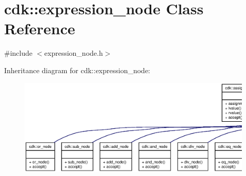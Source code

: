 \section{cdk\+:\+:expression\+\_\+node Class Reference}
\label{classcdk_1_1expression__node}


{\ttfamily \#include $<$expression\+\_\+node.\+h$>$}



Inheritance diagram for cdk\+:\+:expression\+\_\+node\+:
\nopagebreak
\begin{figure}[H]
\begin{center}
\leavevmode
\includegraphics[width=350pt]{classcdk_1_1expression__node__inherit__graph}
\end{center}
\end{figure}


